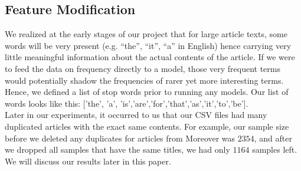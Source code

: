 \subsection{Feature Modification}
We realized at the early stages of our project that for large article texts, some words will be very present (e.g. “the”, “it”, “a” in English) hence carrying very little meaningful information about the actual contents of the article. If we were to feed the data on frequency directly to a model, those very frequent terms would potentially shadow the frequencies of rarer yet more interesting terms. Hence, we defined a list of stop words prior to running any models. Our list of words looks like this: ['the', 'a', 'is','are','for','that','as','it','to','be'].\\
Later in our experiments, it occurred to us that our CSV files had many duplicated articles with the exact same contents. For example, our sample size before we deleted any duplicates for articles from Moreover was $2354$, and after we dropped all samples that have the same titles, we had only $1164$ samples left. We will discuss our results later in this paper.  










